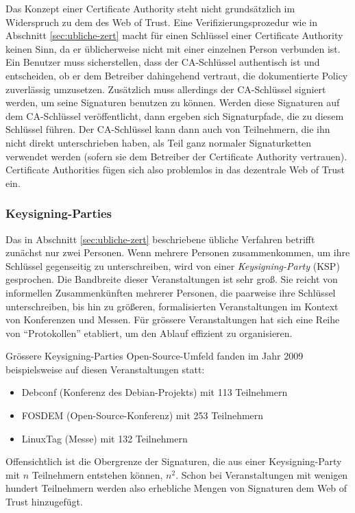 Das Konzept einer Certificate Authority steht nicht grundsätzlich im
Widerspruch zu dem des Web of Trust. Eine Verifizierungsprozedur wie
in Abschnitt \ref{sec:ubliche-zert} macht für einen Schlüssel
einer Certificate Authority keinen Sinn, da er üblicherweise nicht
mit einer einzelnen Person verbunden ist. Ein Benutzer muss
sicherstellen, dass der CA-Schlüssel authentisch ist und
entscheiden, ob er dem Betreiber dahingehend vertraut, die
dokumentierte Policy zuverlässig umzusetzen. Zusätzlich muss
allerdings der CA-Schlüssel signiert werden, um seine Signaturen
benutzen zu können. Werden diese Signaturen auf dem CA-Schlüssel
veröffentlicht, dann ergeben sich Signaturpfade, die zu diesem
Schlüssel führen. Der CA-Schlüssel kann dann auch von
Teilnehmern, die ihn nicht direkt unterschrieben haben, als Teil ganz
normaler Signaturketten verwendet werden (sofern sie dem Betreiber der
Certificate Authority vertrauen). Certificate Authorities fügen sich
also problemlos in das dezentrale Web of Trust ein.

\subsubsection{Keysigning-Parties}
\label{sec:keysigning-parties}

Das in Abschnitt \ref{sec:ubliche-zert} beschriebene übliche Verfahren
betrifft zunächst nur zwei Personen. Wenn mehrere Personen
zusammenkommen, um ihre Schlüssel gegenseitig zu unterschreiben, wird
von einer \emph{Keysigning-Party} (KSP) gesprochen. Die Bandbreite dieser
Veranstaltungen ist sehr groß. Sie reicht von informellen
Zusammenkünften mehrerer Personen, die paarweise ihre Schlüssel
unterschreiben, bis hin zu größeren, formalisierten Veranstaltungen im
Kontext von Konferenzen und Messen. Für grössere
Veranstaltungen hat sich eine Reihe von ``Protokollen'' etabliert, um
den Ablauf effizient zu organisieren\cite{Brennen2008}.

Grössere Keysigning-Parties Open-Source-Umfeld fanden im Jahr 2009
beispielsweise auf diesen Veranstaltungen statt:
\begin{itemize}
\item Debconf (Konferenz des Debian-Projekts) mit 113 Teilnehmern
\item FOSDEM (Open-Source-Konferenz) mit 253 Teilnehmern
\item LinuxTag (Messe) mit 132 Teilnehmern
\end{itemize}

Offensichtlich ist die Obergrenze der Signaturen, die aus einer
Keysigning-Party mit $n$ Teilnehmern entstehen können, $n^2$. Schon
bei Veranstaltungen mit wenigen hundert Teilnehmern werden also
erhebliche Mengen von Signaturen dem Web of Trust hinzugefügt.

